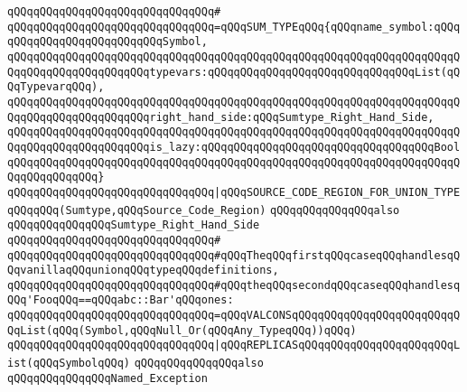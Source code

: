 \verb|qQQqqQQqqQQqqQQqqQQqqQQqqQQqqQQq#|\newline
\verb|qQQqqQQqqQQqqQQqqQQqqQQqqQQqqQQq=qQQqSUM_TYPEqQQq{qQQqname_symbol:qQQqqQQqqQQqqQQqqQQqqQQqqQQqSymbol,|\newline
\verb|qQQqqQQqqQQqqQQqqQQqqQQqqQQqqQQqqQQqqQQqqQQqqQQqqQQqqQQqqQQqqQQqqQQqqQQqqQQqqQQqqQQqqQQqqQQqtypevars:qQQqqQQqqQQqqQQqqQQqqQQqqQQqqQQqList(qQQqTypevarqQQq),|\newline
\verb|qQQqqQQqqQQqqQQqqQQqqQQqqQQqqQQqqQQqqQQqqQQqqQQqqQQqqQQqqQQqqQQqqQQqqQQqqQQqqQQqqQQqqQQqqQQqright_hand_side:qQQqSumtype_Right_Hand_Side,|\newline
\verb|qQQqqQQqqQQqqQQqqQQqqQQqqQQqqQQqqQQqqQQqqQQqqQQqqQQqqQQqqQQqqQQqqQQqqQQqqQQqqQQqqQQqqQQqqQQqis_lazy:qQQqqQQqqQQqqQQqqQQqqQQqqQQqqQQqqQQqBool|\newline
\verb|qQQqqQQqqQQqqQQqqQQqqQQqqQQqqQQqqQQqqQQqqQQqqQQqqQQqqQQqqQQqqQQqqQQqqQQqqQQqqQQqqQQq}|\newline
\newline
\verb|qQQqqQQqqQQqqQQqqQQqqQQqqQQqqQQq|\verb#|qQQqSOURCE_CODE_REGION_FOR_UNION_TYPEqQQqqQQq(Sumtype,qQQqSource_Code_Region)#\newline
\newline
\newline
\newline
\verb|qQQqqQQqqQQqqQQqalso|\newline
\verb|qQQqqQQqqQQqqQQqSumtype_Right_Hand_Side|\newline
\verb|qQQqqQQqqQQqqQQqqQQqqQQqqQQqqQQq#|\newline
\verb|qQQqqQQqqQQqqQQqqQQqqQQqqQQqqQQq#qQQqTheqQQqfirstqQQqcaseqQQqhandlesqQQqvanillaqQQqunionqQQqtypeqQQqdefinitions,|\newline
\verb|qQQqqQQqqQQqqQQqqQQqqQQqqQQqqQQq#qQQqtheqQQqsecondqQQqcaseqQQqhandlesqQQq'FooqQQq==qQQqabc::Bar'qQQqones:|\newline
\newline
\newline
\verb|qQQqqQQqqQQqqQQqqQQqqQQqqQQqqQQq=qQQqVALCONSqQQqqQQqqQQqqQQqqQQqqQQqqQQqList(qQQq(Symbol,qQQqNull_Or(qQQqAny_TypeqQQq))qQQq)|\newline
\verb|qQQqqQQqqQQqqQQqqQQqqQQqqQQqqQQq|\verb#|qQQqREPLICASqQQqqQQqqQQqqQQqqQQqqQQqList(qQQqSymbolqQQq)#\newline
\newline
\newline
\newline
\verb|qQQqqQQqqQQqqQQqalso|\newline
\verb|qQQqqQQqqQQqqQQqNamed_Exception|\newline
